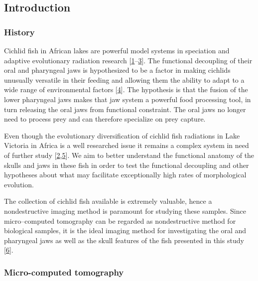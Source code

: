 \hypertarget{introduction}{%
\subsection{Introduction}\label{introduction}}

\hypertarget{history}{%
\subsubsection{History}\label{history}}

Cichlid fish in African lakes are powerful model systems in speciation and adaptive evolutionary radiation research {[}\protect\hyperlink{ref-TUQFenhc}{1}--\protect\hyperlink{ref-WVIa4CH0}{3}{]}.
The functional decoupling of their oral and pharyngeal jaws is hypothesized to be a factor in making cichlids unusually versatile in their feeding and allowing them the ability to adapt to a wide range of environmental factors {[}\protect\hyperlink{ref-1GEljkDsf}{4}{]}.
The hypothesis is that the fusion of the lower pharyngeal jaws makes that jaw system a powerful food processing tool, in turn releasing the oral jaws from functional constraint.
The oral jaws no longer need to process prey and can therefore specialize on prey capture.

Even though the evolutionary diversification of cichlid fish radiations in Lake Victoria in Africa is a well researched issue it remains a complex system in need of further study {[}\protect\hyperlink{ref-W2f2SDjn}{2},\protect\hyperlink{ref-c3poTogo}{5}{]}.
We aim to better understand the functional anatomy of the skulls and jaws in these fish in order to test the functional decoupling and other hypotheses about what may facilitate exceptionally high rates of morphological evolution.

The collection of cichlid fish available is extremely valuable, hence a nondestructive imaging method is paramount for studying these samples.
Since micro--computed tomography can be regarded as nondestructive method for biological samples, it is the ideal imaging method for investigating the oral and pharyngeal jaws as well as the skull features of the fish presented in this study {[}\protect\hyperlink{ref-19h9vxsYG}{6}{]}.

\hypertarget{micro-computed-tomography}{%
\subsubsection{Micro-computed tomography}\label{micro-computed-tomography}}

